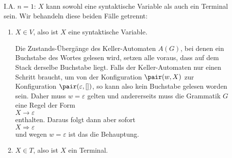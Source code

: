 \begin{enumerate}
\item[I.A.] $n=1$: $X$ kann sowohl eine syntaktische Variable als auch ein Terminal sein.
            Wir behandeln diese beiden F\"alle getrennt:
            \begin{enumerate}
            \item $X \in V$, also ist $X$ eine syntaktische Variable.

                  Die Zustands-\"Uberg\"ange des Keller-Automaten $A(G)$, bei denen ein Buchstabe
                  des Wortes gelesen wird, setzen alle voraus, dass auf dem Stack 
                  derselbe Buchstabe liegt.
                  Falls der Keller-Automaten nur einen Schritt braucht, um von der
                  Konfiguration $\pair(w,X)$ zur Konfiguration $\pair(\varepsilon,[])$,
                  so kann also kein Buchstabe gelesen worden sein.
                  Daher muss $w = \varepsilon$ gelten und andererseits muss
                  die Grammatik $G$ eine Regel der Form
                  \\[0.2cm]
                  \hspace*{1.3cm}
                  $X \rightarrow \varepsilon$
                  \\[0.2cm]
                  enthalten.  Daraus folgt dann aber sofort
                  \\[0.2cm]
                  \hspace*{1.3cm}
                  $X \Rightarrow \varepsilon$
                  \\[0.2cm]
                  und wegen $w= \varepsilon$ ist das die Behauptung.
            \item $X \in T$, also ist $X$ ein Terminal.


\end{enumerate}
\end{enumerate}
